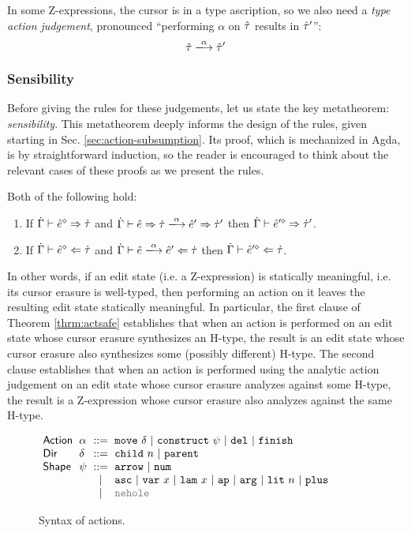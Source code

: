 In some Z-expressions, the cursor is in a type ascription, so we also need
a \emph{type action judgement}, pronounced ``performing $\alpha$ on $\hat{\tau}$
results in $\hat{\tau}'$'':
\[
\performTyp{\ztau}{\alpha}{\ztau'}
\]

\subsubsection{Sensibility}


Before giving the rules for these judgements, let us state the key
metatheorem: \emph{sensibility}. This metatheorem deeply informs the design
of the rules, given starting in Sec. \ref{sec:action-subsumption}. Its
proof, which is mechanized in Agda, is by straightforward induction, so the
reader is encouraged to think about the relevant cases of these proofs as
we present the rules.
\begin{theorem}
  \label{thrm:actsafe} Both of the following hold:
  \begin{enumerate}[itemsep=0px,partopsep=0px,topsep=0px]
  \item If $\dot{\Gamma} \vdash \hat{e}^{\diamond} \Rightarrow \dot{\tau}$ and
    $\performSyn{\hGamma}{\zexp}{\htau}{\alpha}{\zexp'}{\htau'}$ then
    $\dot{\Gamma} \vdash \hat{e}'^{\diamond} \Rightarrow \dot{\tau}'$.
  \item If $\dot{\Gamma} \vdash \hat{e}^{\diamond} \Leftarrow \dot{\tau}$ and
    $\performAna{\hGamma}{\zexp}{\htau}{\alpha}{\zexp'}$ then
    $\dot{\Gamma} \vdash \hat{e}'^{\diamond} \Leftarrow \dot{\tau}$.
  \end{enumerate}
\end{theorem}
\noindent In other words, if an edit state (i.e. a Z-expression) is
statically meaningful, i.e. its cursor erasure is well-typed, then
performing an action on it leaves the resulting edit state statically
meaningful. In particular, the first clause of Theorem \ref{thrm:actsafe}
establishes that when an action is performed on an edit state whose cursor
erasure synthesizes an H-type, the result is an edit state whose cursor
erasure also synthesizes some (possibly different) H-type. The second
clause establishes that when an action is performed using the analytic
action judgement on an edit state whose cursor erasure analyzes against
some H-type, the result is a Z-expression whose cursor erasure also
analyzes against the same H-type.

\begin{figure}[t]
\hspace{-3px}$\arraycolsep=3pt\begin{array}{llcllll}
\mathsf{Action} & \alpha & ::= &
  \aMove{\delta} ~\vert~
  \aConstruct{\psi} ~\vert~
  \aDel ~\vert~
  \aFinish\\
\mathsf{Dir} & \delta & ::= &
  \dChildnm{n} ~\vert~
  \dParent\\
\mathsf{Shape} & \psi & ::= &
  \farr ~\vert~
  \fnum \\
& & \vert &
  \fasc ~\vert~
  \fvar{x} ~\vert~
  \flam{x} ~\vert~
  \fap ~\vert~
  \farg ~\vert~
  \fnumlit{n} ~\vert~
  \fplus\\
& & \vert &
  {\color{gray}\fnehole}
\end{array}$
\caption{Syntax of actions.}
\label{fig:action-syntax}
\end{figure}

